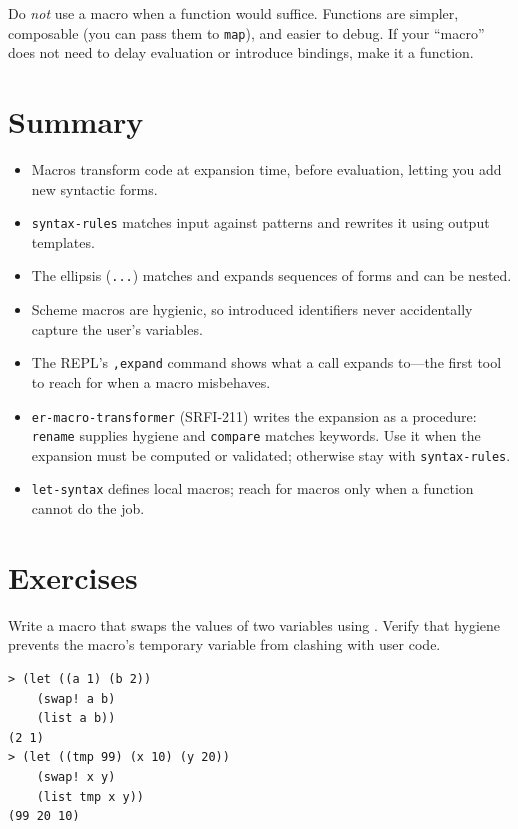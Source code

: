 Do \emph{not} use a macro when a function would suffice. Functions are simpler, composable (you can pass them to \texttt{map}), and easier to debug. If your ``macro'' does not need to delay evaluation or introduce bindings, make it a function.

\section*{Summary}

\begin{itemize}
    \item Macros transform code at expansion time, before evaluation, letting you add new syntactic forms.
    \item \texttt{syntax-rules} matches input against patterns and rewrites it using output templates.
    \item The ellipsis (\texttt{...}) matches and expands sequences of forms and can be nested.
    \item Scheme macros are hygienic, so introduced identifiers never accidentally capture the user's variables.
    \item The REPL's \texttt{,expand} command shows what a call expands to---the first tool to reach for when a macro misbehaves.
    \item \texttt{er-macro-transformer} (SRFI-211) writes the expansion as a procedure: \texttt{rename} supplies hygiene and \texttt{compare} matches keywords. Use it when the expansion must be computed or validated; otherwise stay with \texttt{syntax-rules}.
    \item \texttt{let-syntax} defines local macros; reach for macros only when a function cannot do the job.
\end{itemize}

\section*{Exercises}

\begin{exercise}[Swap!]
Write a  macro that swaps the values of two variables using . Verify that hygiene prevents the macro's temporary variable from clashing with user code.

\begin{lstlisting}[style=repl]
> (let ((a 1) (b 2))
    (swap! a b)
    (list a b))
(2 1)
> (let ((tmp 99) (x 10) (y 20))
    (swap! x y)
    (list tmp x y))
(99 20 10)
\end{lstlisting}
\end{exercise}

